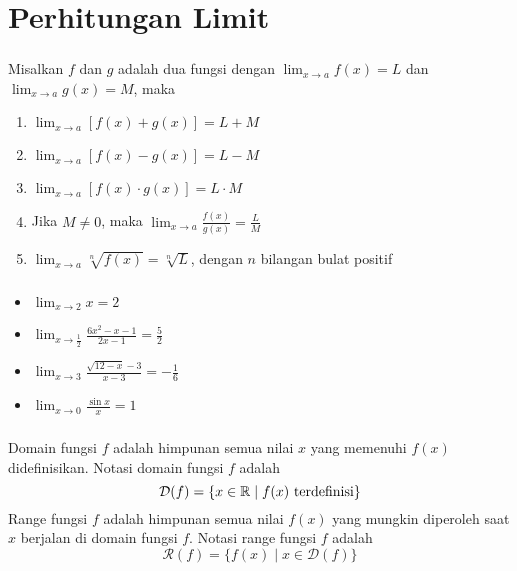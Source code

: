 \documentclass{../../kalkulus-ppt}
\newcommand{\dom}{\mathcal{D}}
\newcommand{\rng}{\mathcal{R}}
\begin{document}
\section{Perhitungan Limit}
\begin{frame}
    \frametitle{\insertsection}
    \begin{teorema}
        Misalkan $f$ dan $g$ adalah dua fungsi dengan $\displaystyle\lim_{x\to a} f(x)=L$ dan $\displaystyle\lim_{x\to a} g(x)=M$, maka
        \begin{enumerate}
            \item $\displaystyle\lim_{x\to a} [f(x)+g(x)]=L+M$
            \item $\displaystyle\lim_{x\to a} [f(x)-g(x)]=L-M$
            \item $\displaystyle\lim_{x\to a} [f(x)\cdot g(x)]=L\cdot M$
            \item Jika $M\ne 0$, maka $\displaystyle\lim_{x\to a} \frac{f(x)}{g(x)}=\frac{L}{M}$
            \item $\displaystyle\lim_{x\to a} \sqrt[n]{f(x)}=\sqrt[n]{L}$, dengan $n$ bilangan bulat positif
        \end{enumerate}
    \end{teorema}
\end{frame}
\begin{frame}
    \frametitle{\insertsection}
    \begin{contoh}
        \begin{itemize}
            \item $\displaystyle\lim_{x\to 2} x=2$
            \item $\displaystyle\lim_{x\to \frac{1}{2}} \frac{6x^2-x-1}{2x-1}=\frac{5}{2}$
            \item $\displaystyle\lim_{x\to 3} \frac{\sqrt{12-x}-3}{x-3}=-\frac{1}{6}$
            \item $\displaystyle\lim_{x\to 0} \frac{\sin x}{x}=1$
        \end{itemize}
    \end{contoh}
\end{frame}
\begin{frame}
    \frametitle{\insertsection}
    \begin{definisi}
        Domain fungsi $f$ adalah himpunan semua nilai $x$ yang memenuhi $f(x)$ didefinisikan. Notasi domain fungsi $f$ adalah \[\dom(f)=\{x\in\R\mid f(x)\text{ terdefinisi}\}\]
        Range fungsi $f$ adalah himpunan semua nilai $f(x)$ yang mungkin diperoleh saat $x$ berjalan di domain fungsi $f$. Notasi range fungsi $f$ adalah \[\rng(f)=\{f(x)\mid x\in\dom(f)\}\]
    \end{definisi}
\end{frame}
\end{document}
